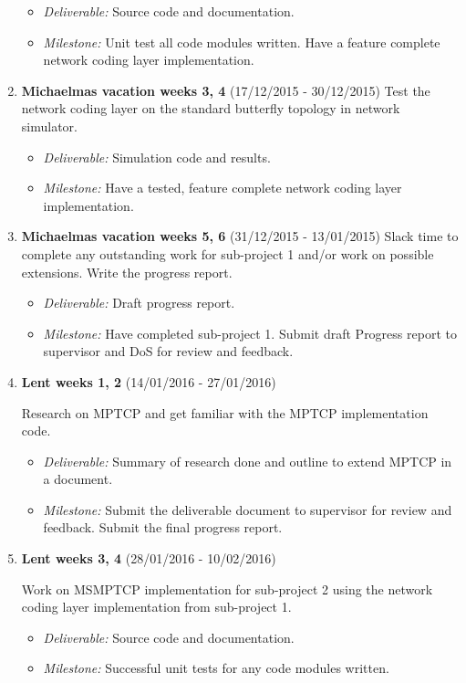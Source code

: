 \documentclass[12pt,a4paper,twoside]{article}
\begin{document}
\begin{enumerate}
\begin{itemize}
  \item {\em Deliverable:} Source code and documentation.
  \item {\em Milestone:} Unit test all code modules written. Have a feature complete network coding layer implementation.
\end{itemize}

\item {\bf Michaelmas vacation weeks 3, 4} (17/12/2015 - 30/12/2015)
Test the network coding layer on the standard butterfly topology in network simulator.

\begin{itemize}
  \item {\em Deliverable:} Simulation code and results.
  \item {\em Milestone:} Have a tested, feature complete network coding layer implementation.
\end{itemize}

\item {\bf Michaelmas vacation weeks 5, 6} (31/12/2015 - 13/01/2015)
Slack time to complete any outstanding work for sub-project 1 and/or work on possible extensions.
Write the progress report. 

\begin{itemize}
  \item {\em Deliverable:} Draft progress report.
  \item {\em Milestone:} Have completed sub-project 1. Submit draft Progress report to supervisor and DoS for review and feedback.
\end{itemize}

\item {\bf Lent weeks 1, 2} (14/01/2016 - 27/01/2016)

Research on MPTCP and get familiar with the MPTCP implementation code.
\begin{itemize}
  \item {\em Deliverable:} Summary of research done and outline to extend MPTCP in a document.
  \item {\em Milestone:} Submit the deliverable document to supervisor for review and feedback. Submit the final progress report.
\end{itemize}

\item {\bf Lent weeks 3, 4} (28/01/2016 - 10/02/2016)

Work on MSMPTCP implementation for sub-project 2 using the network coding layer implementation from sub-project 1.
\begin{itemize}
  \item {\em Deliverable:} Source code and documentation.
  \item {\em Milestone:} Successful unit tests for any code modules written.
\end{itemize}


\end{enumerate}
\end{document}
